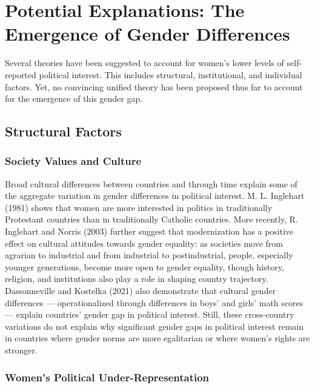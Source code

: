 \documentclass[
  letterpaper,
  DIV=11,
  numbers=noendperiod]{scrreprt}
\begin{document}
\hypertarget{potential-explanations-the-emergence-of-gender-differences}{%
\section{Potential Explanations: The Emergence of Gender
Differences}\label{potential-explanations-the-emergence-of-gender-differences}}

Several theories have been suggested to account for women's lower levels
of self-reported political interest. This includes structural,
institutional, and individual factors. Yet, no convincing unified theory
has been proposed thus far to account for the emergence of this gender
gap.

\hypertarget{structural-factors}{%
\subsection{Structural Factors}\label{structural-factors}}

\hypertarget{society-values-and-culture}{%
\subsubsection{Society Values and
Culture}\label{society-values-and-culture}}

Broad cultural differences between countries and through time explain
some of the aggregate variation in gender differences in political
interest. M. L. Inglehart (1981) shows that women are more interested in
politics in traditionally Protestant countries than in traditionally
Catholic countries. More recently, R. Inglehart and Norris (2003)
further suggest that modernization has a positive effect on cultural
attitudes towards gender equality: as societies move from agrarian to
industrial and from industrial to postindustrial, people, especially
younger generations, become more open to gender equality, though
history, religion, and institutions also play a role in shaping country
trajectory. Dassonneville and Kostelka (2021) also demonstrate that
cultural gender differences --- operationalized through differences in
boys' and girls' math scores --- explain countries' gender gap in
political interest. Still, these cross-country variations do not explain
why significant gender gaps in political interest remain in countries
where gender norms are more egalitarian or where women's rights are
stronger.

\hypertarget{womens-political-under-representation}{%
\subsubsection{Women's Political
Under-Representation}\label{womens-political-under-representation}}
\end{document}
